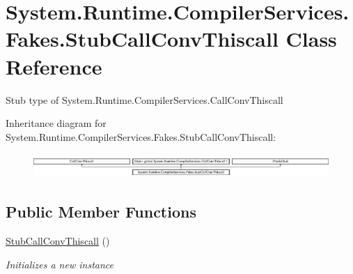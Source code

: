 \hypertarget{class_system_1_1_runtime_1_1_compiler_services_1_1_fakes_1_1_stub_call_conv_thiscall}{\section{System.\-Runtime.\-Compiler\-Services.\-Fakes.\-Stub\-Call\-Conv\-Thiscall Class Reference}
\label{class_system_1_1_runtime_1_1_compiler_services_1_1_fakes_1_1_stub_call_conv_thiscall}
}


Stub type of System.\-Runtime.\-Compiler\-Services.\-Call\-Conv\-Thiscall 


Inheritance diagram for System.\-Runtime.\-Compiler\-Services.\-Fakes.\-Stub\-Call\-Conv\-Thiscall\-:\begin{figure}[H]
\begin{center}
\leavevmode
\includegraphics[height=0.931006cm]{class_system_1_1_runtime_1_1_compiler_services_1_1_fakes_1_1_stub_call_conv_thiscall}
\end{center}
\end{figure}
\subsection*{Public Member Functions}
\begin{DoxyCompactItemize}
\item 
\hyperlink{class_system_1_1_runtime_1_1_compiler_services_1_1_fakes_1_1_stub_call_conv_thiscall_ae7373366868d75a05ea463eea11ff855}{Stub\-Call\-Conv\-Thiscall} ()
\begin{DoxyCompactList}\small\item\em Initializes a new instance\end{DoxyCompactList}\end{DoxyCompactItemize}
